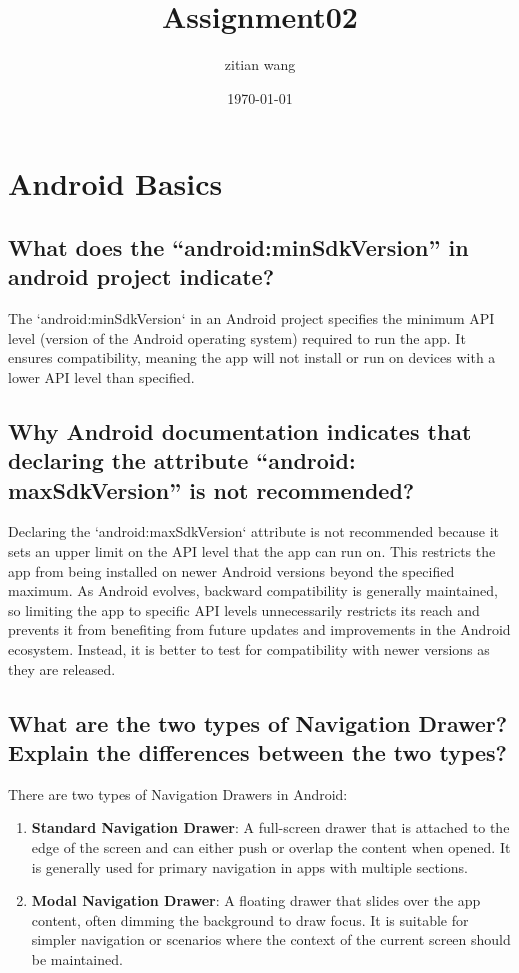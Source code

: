\documentclass{article}
\title{Assignment02}
\author{zitian wang}
\date{\today}
\begin{document}
\maketitle

\section{Android Basics}
\subsection{What does the “android:minSdkVersion” in android project indicate?}
The `android:minSdkVersion` in an Android project specifies the minimum API level (version of the Android operating system) required to run the app. It ensures compatibility, meaning the app will not install or run on devices with a lower API level than specified. 

\subsection{Why Android documentation indicates that declaring the attribute “android:
maxSdkVersion” is not recommended?}
Declaring the `android:maxSdkVersion` attribute is not recommended because it sets an upper limit on the API level that the app can run on. This restricts the app from being installed on newer Android versions beyond the specified maximum. As Android evolves, backward compatibility is generally maintained, so limiting the app to specific API levels unnecessarily restricts its reach and prevents it from benefiting from future updates and improvements in the Android ecosystem. Instead, it is better to test for compatibility with newer versions as they are released.

\subsection{What are the two types of Navigation Drawer? Explain the differences between the two types?}
There are two types of Navigation Drawers in Android:
\begin{enumerate}
    \item \textbf{Standard Navigation Drawer}: 
    A full-screen drawer that is attached to the edge of the screen and can either push or overlap the content when opened. It is generally used for primary navigation in apps with multiple sections.
    
    \item \textbf{Modal Navigation Drawer}:
    A floating drawer that slides over the app content, often dimming the background to draw focus. It is suitable for simpler navigation or scenarios where the context of the current screen should be maintained.
\end{enumerate}
\end{document}
